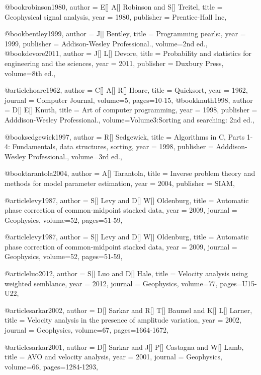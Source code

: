 @book{robinson1980,
  author =	 {E[] A[] Robinson and S[] Treitel},
  title =	 {Geophysical signal analysis},
  year =	 1980,
  publisher =	 {Prentice-Hall Inc},
}

@book{bentley1999,
  author =	 {J[] Bentley},
  title =	 {Programming pearls:},
  year =	 1999,
  publisher =	 {Addison-Wesley Professional.},
  volume={2nd ed.},
}
@book{devore2011,
  author =	 {J[] L[] Devore},
  title =	 {Probability and statistics for engineering and the sciences},
  year =	 2011,
  publisher =	 {Duxbury Press},
  volume={8th ed.},
}

@article{hoare1962,
  author =	 {C[] A[] R[] Hoare},
  title =	 {Quicksort},
  year =	 1962,
  journal =	 {Computer Journal},
  volume={5},
 pages=10-15,
}
@book{knuth1998,
  author =	 {D[] E[] Knuth},
  title =	 {Art of computer programming},
  year =	 1998,
  publisher =	 { Adddison-Wesley Professional.},
  volume={Volume3:Sorting and searching: 2nd ed.},
}

@book{sedgewick1997,
  author =	 {R[] Sedgewick},
  title =	 {Algorithms in C, Parts 1-4: Fundamentals, data structures, sorting},
  year =	 1998,
  publisher =	 { Adddison-Wesley Professional.},
  volume={3rd ed.},
}

@book{tarantola2004,
  author =	 {A[] Tarantola},
  title =	 {Inverse problem theory and methods for model parameter estimation},
  year =	 2004,
  publisher =	 { SIAM},
}

@article{levy1987,
  author =	 {S[] Levy and D[] W[] Oldenburg},
  title =	 {Automatic phase correction of common-midpoint stacked data},
  year =	 2009,
  journal =	 {Geophysics},
  volume={52},
 pages=51-59,
}

@article{levy1987,
  author =	 {S[] Levy and D[] W[] Oldenburg},
  title =	 {Automatic phase correction of common-midpoint stacked data},
  year =	 2009,
  journal =	 {Geophysics},
  volume={52},
 pages=51-59,
}

@article{luo2012,
  author =	 {S[] Luo and D[] Hale},
  title =	 {Velocity analysis using weighted semblance},
  year =	 2012,
  journal =	 {Geophysics},
  volume={77},
 pages=U15-U22,
}

@article{sarkar2002,
  author =	 {D[] Sarkar and R[] T[] Baumel and K[] L[] Larner},
  title =	 {Velocity analysis in the presence of amplitude variation},
  year =	 2002,
  journal =	 {Geophysics},
  volume={67},
  pages=1664-1672,
}

@article{sarkar2001,
  author =	 {D[] Sarkar and J[] P[] Castagna and W[] Lamb},
  title =	 {AVO and velocity analysis},
  year =	 2001,
  journal =	 {Geophysics},
  volume={66},
 pages=1284-1293,
}

